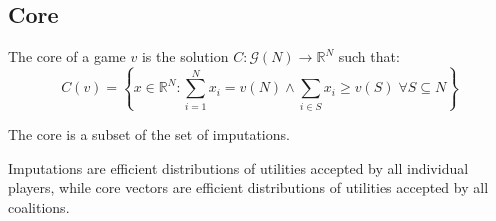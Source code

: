 \documentclass[../main.tex]{subfiles}
\begin{document}
\subsection{Core}
\vspace{0.25cm}
\begin{definition}[Core]
    The core of a game $v$ is the solution $C: \mathcal{G}(N) \to \mathbb{R}^N$ such that:
    \[
        C(v) = \left\{ x \in \mathbb{R}^N : \sum_{i=1}^{N} x_i = v(N) \land \sum_{i \in S} x_i \geq v(S) \; \forall S \subseteq N \right\}
    \]
\end{definition}
The core is a subset of the set of imputations.

Imputations are efficient distributions of utilities accepted by all individual players, while core vectors are efficient distributions of utilities accepted by all coalitions.
\end{document}
